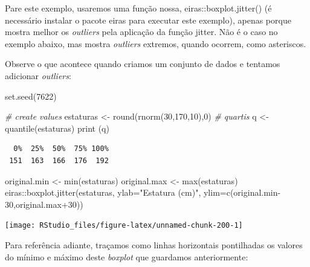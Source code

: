 \documentclass[
]{article}
\newenvironment{Shaded}{\begin{snugshade}}{\end{snugshade}}
\newcommand{\AttributeTok}[1]{\textcolor[rgb]{0.77,0.63,0.00}{#1}}
\newcommand{\CommentTok}[1]{\textcolor[rgb]{0.56,0.35,0.01}{\textit{#1}}}
\newcommand{\DecValTok}[1]{\textcolor[rgb]{0.00,0.00,0.81}{#1}}
\newcommand{\FunctionTok}[1]{\textcolor[rgb]{0.00,0.00,0.00}{#1}}
\newcommand{\NormalTok}[1]{#1}
\newcommand{\OtherTok}[1]{\textcolor[rgb]{0.56,0.35,0.01}{#1}}
\newcommand{\SpecialCharTok}[1]{\textcolor[rgb]{0.00,0.00,0.00}{#1}}
\newcommand{\StringTok}[1]{\textcolor[rgb]{0.31,0.60,0.02}{#1}}
\begin{document}
Pare este exemplo, usaremos uma função nossa, eiras::boxplot.jitter() (é
necessário instalar o pacote eiras para executar este exemplo), apenas
porque mostra melhor os \emph{outliers} pela aplicação da função jitter.
Não é o caso no exemplo abaixo, mas mostra \emph{outliers} extremos,
quando ocorrem, como asteriscos.

Observe o que acontece quando criamos um conjunto de dados e tentamos
adicionar \emph{outliers}:

\begin{Shaded}
\begin{Highlighting}[]
\FunctionTok{set.seed}\NormalTok{(}\DecValTok{7622}\NormalTok{)}

\CommentTok{\# create values}
\NormalTok{estaturas }\OtherTok{\textless{}{-}} \FunctionTok{round}\NormalTok{(}\FunctionTok{rnorm}\NormalTok{(}\DecValTok{30}\NormalTok{,}\DecValTok{170}\NormalTok{,}\DecValTok{10}\NormalTok{),}\DecValTok{0}\NormalTok{)}
\CommentTok{\# quartis}
\NormalTok{q }\OtherTok{\textless{}{-}} \FunctionTok{quantile}\NormalTok{(estaturas)}
\FunctionTok{print}\NormalTok{ (q)}
\end{Highlighting}
\end{Shaded}

\begin{verbatim}
  0%  25%  50%  75% 100% 
 151  163  166  176  192 
\end{verbatim}

\begin{Shaded}
\begin{Highlighting}[]
\NormalTok{original.min }\OtherTok{\textless{}{-}} \FunctionTok{min}\NormalTok{(estaturas)}
\NormalTok{original.max }\OtherTok{\textless{}{-}} \FunctionTok{max}\NormalTok{(estaturas)}
\NormalTok{eiras}\SpecialCharTok{::}\FunctionTok{boxplot.jitter}\NormalTok{(estaturas, }\AttributeTok{ylab=}\StringTok{"Estatura (cm)"}\NormalTok{, }
                      \AttributeTok{ylim=}\FunctionTok{c}\NormalTok{(original.min}\DecValTok{{-}30}\NormalTok{,original.max}\SpecialCharTok{+}\DecValTok{30}\NormalTok{))}
\end{Highlighting}
\end{Shaded}

\begin{center}\texttt{[image: RStudio\_files/figure-latex/unnamed-chunk-200-1]} \end{center}

Para referência adiante, traçamos como linhas horizontais pontilhadas os
valores do mínimo e máximo deste \emph{boxplot} que guardamos
anteriormente:
\end{document}
